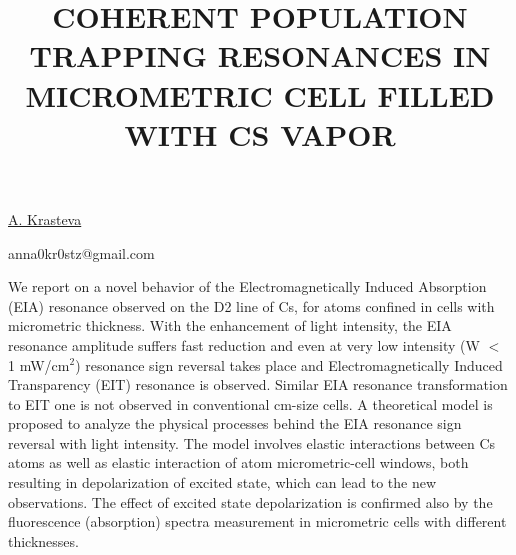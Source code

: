 \title{COHERENT POPULATION TRAPPING RESONANCES IN MICROMETRIC CELL FILLED WITH CS VAPOR}

\underline{A. Krasteva}

{\normalsize{\vspace{-4mm}
\electronicinstitute

\email anna0kr0stz@gmail.com}}

We report on a novel behavior of the Electromagnetically Induced Absorption (EIA) resonance observed on the D2 line of Cs, for atoms confined in cells with micrometric thickness. With the enhancement of light intensity, the EIA resonance amplitude suffers fast reduction and even at very low intensity (W $<$ 1 mW/cm$^2$) resonance sign reversal takes place and Electromagnetically Induced Transparency (EIT) resonance is observed. Similar EIA resonance transformation to EIT one is not observed in conventional cm-size cells. A theoretical model is proposed to analyze the physical processes behind the EIA resonance sign reversal with light intensity. The model involves elastic interactions between Cs atoms as well as elastic interaction of atom micrometric-cell windows, both resulting in depolarization of excited state, which can lead to the new observations. The effect of excited state depolarization is confirmed also by the fluorescence (absorption) spectra measurement in micrometric cells with different thicknesses.

\vspace{\baselineskip} 